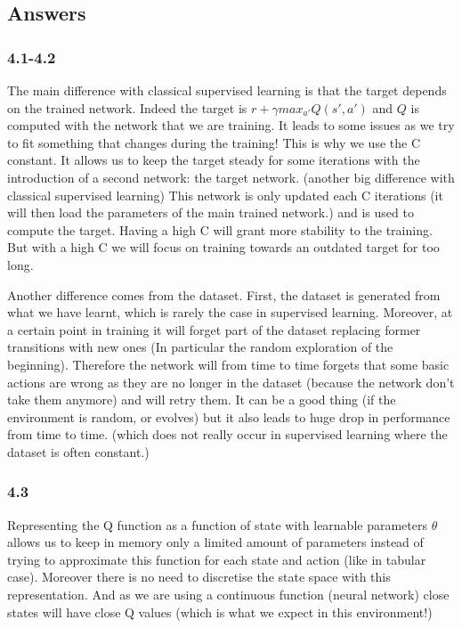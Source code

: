 \documentclass[a4paper]{article}
\begin{document}
\subsection*{Answers}
\subsubsection*{4.1-4.2}
The main difference with classical supervised learning is that the target depends on the trained network. Indeed the target is $r + \gamma max_{a'} Q(s', a')$
and $Q$ is computed with the network that we are training. It leads to some issues as we try to fit something that changes during the training! This is why
we use the C constant. It allows us to keep the target steady for some iterations with the introduction of a second network: the target network. (another big
difference with classical supervised learning) This network
is only updated each C iterations (it will then load the parameters of the main trained network.) and is used to compute the target. Having a high C will
grant more stability to the training. But with a high C we will focus on training towards an outdated target for too long.

Another difference comes from the dataset. First, the dataset is generated from what we have learnt, which is rarely the case in supervised learning.
Moreover, at a certain point in training it will forget part of the dataset replacing former transitions with new ones (In particular the random exploration
of the beginning). Therefore the network will from time to time forgets that some basic actions are wrong as they are no longer in the dataset
(because the network don't take them anymore) and will retry them. It can be a good thing (if the environment is random, or evolves) but it also leads to
huge drop in performance from time to time. (which does not really occur in supervised learning where the dataset is often constant.)

\subsubsection*{4.3}
Representing the Q function as a function of state with learnable parameters $\theta$ allows us to keep in memory only a limited amount of
parameters instead of trying to approximate this function for each state and action (like in tabular case). Moreover there is no need to discretise the state space
with this representation. And as we are using a continuous function (neural network) close states will have close Q values
(which is what we expect in this environment!)
\end{document}
